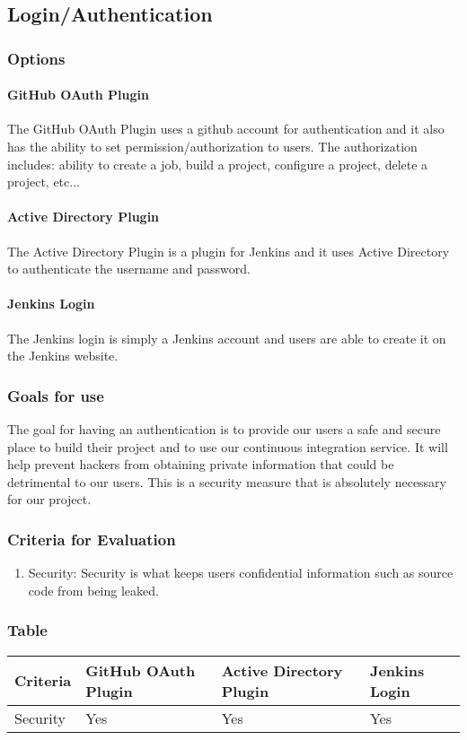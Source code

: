 \documentclass[10pt,letterpaper,onecolumn,draftclsnofoot]{IEEEtran}
\begin{document}
\subsection{Login/Authentication}
\subsubsection{Options}
\paragraph{GitHub OAuth Plugin}
The GitHub OAuth Plugin uses a github account for authentication and it also has the ability to set permission/authorization to users. The authorization includes: ability to create a job, build a project, configure a project, delete a project, etc...
\paragraph{Active Directory Plugin}
The Active Directory Plugin is a plugin for Jenkins and it uses Active Directory to authenticate the username and password.
\paragraph{Jenkins Login}
The Jenkins login is simply a Jenkins account and users are able to create it on the Jenkins website.
\subsubsection{Goals for use}
The goal for having an authentication is to provide our users a safe and secure place to build their project and to use our continuous integration service.
It will help prevent hackers from obtaining private information that could be detrimental to our users.
This is a security measure that is absolutely necessary for our project.
\subsubsection{Criteria for Evaluation}
\begin{enumerate}
  \item Security: Security is what keeps users confidential information such as source code from being leaked.
\end{enumerate}
\subsubsection{Table}
\begin{center}
  \begin{tabular}{llll}
    Criteria & GitHub OAuth Plugin & Active Directory Plugin & Jenkins Login\\ \midrule
    Security       & Yes & Yes & Yes \\ \midrule
  \end{tabular}
\end{center}
\end{document}
